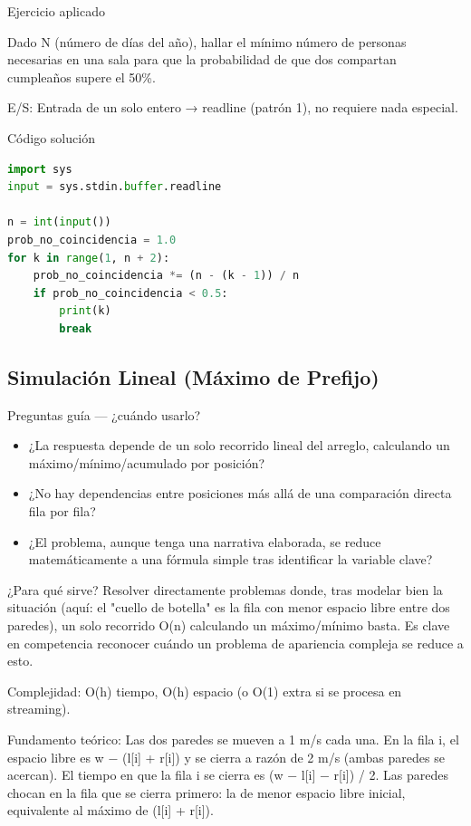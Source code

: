 Ejercicio aplicado

Dado N (número de días del año), hallar el mínimo número de personas necesarias en una sala para que la probabilidad de que dos compartan cumpleaños supere el 50\%.

E/S: Entrada de un solo entero → readline (patrón 1), no requiere nada especial.

Código solución

\begin{lstlisting}[language=Python]
import sys
input = sys.stdin.buffer.readline
 
n = int(input())
prob_no_coincidencia = 1.0
for k in range(1, n + 2):
    prob_no_coincidencia *= (n - (k - 1)) / n
    if prob_no_coincidencia < 0.5:
        print(k)
        break
\end{lstlisting}


\subsection{Simulación Lineal (Máximo de Prefijo)}

Preguntas guía — ¿cuándo usarlo?

\begin{itemize}
\item ¿La respuesta depende de un solo recorrido lineal del arreglo, calculando un máximo/mínimo/acumulado por posición?
\item ¿No hay dependencias entre posiciones más allá de una comparación directa fila por fila?
\item ¿El problema, aunque tenga una narrativa elaborada, se reduce matemáticamente a una fórmula simple tras identificar la variable clave?
\end{itemize}

¿Para qué sirve? Resolver directamente problemas donde, tras modelar bien la situación (aquí: el "cuello de botella" es la fila con menor espacio libre entre dos paredes), un solo recorrido O(n) calculando un máximo/mínimo basta. Es clave en competencia reconocer cuándo un problema de apariencia compleja se reduce a esto.

Complejidad: O(h) tiempo, O(h) espacio (o O(1) extra si se procesa en streaming).

Fundamento teórico: Las dos paredes se mueven a 1 m/s cada una. En la fila i, el espacio libre es w − (l[i] + r[i]) y se cierra a razón de 2 m/s (ambas paredes se acercan). El tiempo en que la fila i se cierra es (w − l[i] − r[i]) / 2. Las paredes chocan en la fila que se cierra primero: la de menor espacio libre inicial, equivalente al máximo de (l[i] + r[i]).

